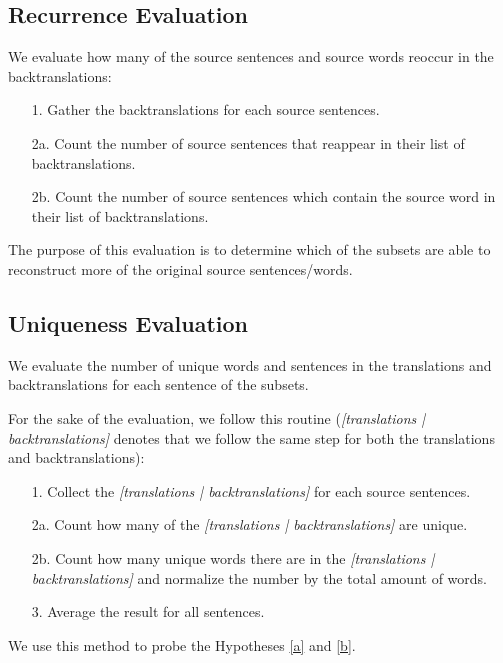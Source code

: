 \subsection{Recurrence Evaluation}
\label{sec:Base_Experiment:Statistics:Recurrence}
We evaluate how many of the source sentences and source words reoccur in the backtranslations:

\begin{enumerate}
    \item[1. ] Gather the backtranslations for each source sentences.
    \item[2a. ] Count the number of source sentences that reappear in their list of backtranslations.
    \item[2b. ] Count the number of source sentences which contain the source word in their list of backtranslations.
\end{enumerate}

The purpose of this evaluation is to determine which of the subsets are able to reconstruct more of the original source sentences/words.

\subsection{Uniqueness Evaluation}
\label{sec:Base_Experiment:Statistics:Uniqueness}
We evaluate the number of unique words and sentences in the translations and backtranslations for each sentence of the subsets. 

For the sake of the evaluation, we follow this routine (\textit{[translations | backtranslations]} denotes that we follow the same step for both the translations and backtranslations):
\begin{enumerate}
    \item[1. ] Collect the \textit{[translations | backtranslations]} for each source sentences.
    \item[2a. ] Count how many of the \textit{[translations | backtranslations]} are unique. 
    \item[2b. ] Count how many unique words there are in the \textit{[translations | backtranslations]} and normalize the number by the total amount of words. 
    \item[3. ] Average the result for all sentences.
\end{enumerate}

We use this method to probe the Hypotheses \ref{a} and \ref{b}. 

